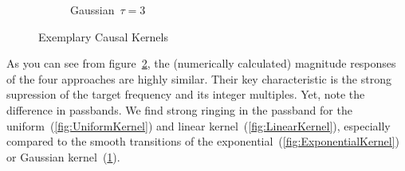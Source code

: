\documentclass[a4paper]{article}
\begin{document}
\begin{figure}[hbtp]
\begin{subfigure}{.245\textwidth}
        \caption{Gaussian~$\tau=3$}\label{fig:GaussKernel}
    \end{subfigure}
    \caption{Exemplary Causal Kernels}\label{fig:ExemplaryCausalKernels}
\end{figure}

As you can see from figure~\ref{fig:ExemplaryCausalKernels}, the (numerically calculated) magnitude responses of the four approaches are highly similar. Their key characteristic is the strong supression of the target frequency and its integer multiples.
Yet, note the difference in passbands. We find strong ringing in the passband for the uniform~(\ref{fig:UniformKernel}) and linear kernel~(\ref{fig:LinearKernel}), especially compared to the smooth transitions of the exponential~(\ref{fig:ExponentialKernel}) or Gaussian kernel~(\ref{fig:GaussKernel}).
\end{document}
